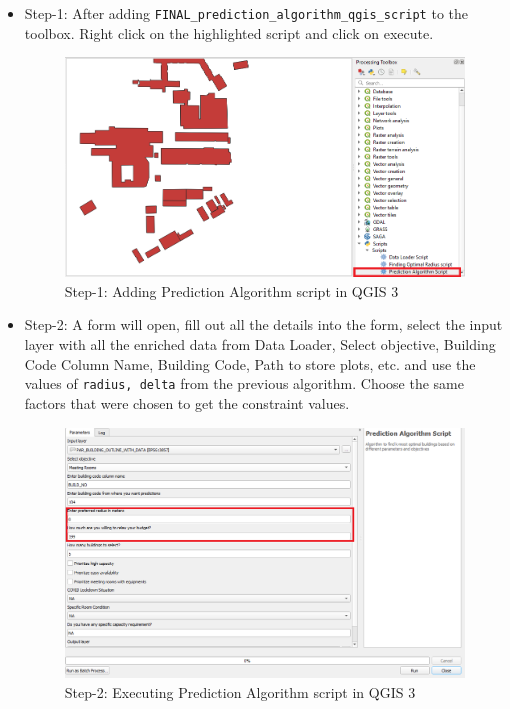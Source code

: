 \begin{itemize}
    \item Step-1: After adding \texttt{FINAL\_prediction\_algorithm\_qgis\_script} to the toolbox. Right click on the highlighted script and click on execute.

    
\begin{figure}[H]
\centering
\includegraphics[width=12cm,keepaspectratio=true]{resources/p1.PNG}
\caption{Step-1: Adding Prediction Algorithm script in QGIS 3}
\label{fig:p1}
\end{figure}

\item Step-2: A form will open, fill out all the details into the form,
select the input layer with all the enriched data from Data Loader, Select objective, Building Code Column Name, Building Code, Path to store plots, etc. and use the values of \texttt{radius, delta} from the previous algorithm. Choose the same factors that were chosen to get the constraint values.

\begin{figure}[H]
\centering
\includegraphics[width=12cm,keepaspectratio=true]{resources/p2.PNG}
\caption{Step-2: Executing Prediction Algorithm script in QGIS 3}
\label{fig:p2}
\end{figure}


\end{itemize}
